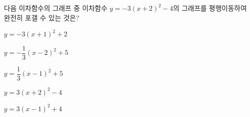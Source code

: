 다음 이차함수의 그래프 중 이차함수 $y=-3(x+2)^2-4$의 그래프를 평행이동하여 완전히 포갤 수 있는 것은?
\begin{choicesii}{\rule[-3ex]{0pt}{8ex}$y=-3(x+1)^2+2$}{\rule[-3ex]{0pt}{8ex}$y=-\dfrac{1}{3}(x-2)^2+5$}{\rule[-3ex]{0pt}{8ex}$y=\dfrac{1}{3}(x-1)^2+5$}{\rule[-3ex]{0pt}{8ex}$y=3(x+2)^2-4$}{\rule[-3ex]{0pt}{8ex}$y=3(x-1)^2+4$}\end{choicesii}
